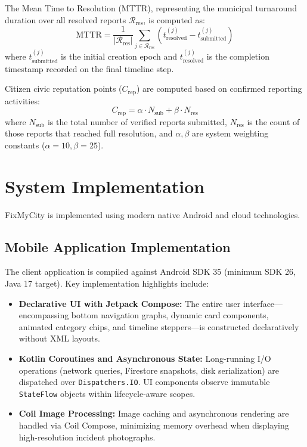 \documentclass[conference]{IEEEtran}
\begin{document}
The Mean Time to Resolution (MTTR), representing the municipal turnaround duration over all resolved reports $\mathcal{R}_{\text{res}}$, is computed as:
\begin{equation}
\text{MTTR} = \frac{1}{|\mathcal{R}_{\text{res}}|} \sum_{j \in \mathcal{R}_{\text{res}}} \left( t_{\text{resolved}}^{(j)} - t_{\text{submitted}}^{(j)} \right)
\end{equation}
where $t_{\text{submitted}}^{(j)}$ is the initial creation epoch and $t_{\text{resolved}}^{(j)}$ is the completion timestamp recorded on the final timeline step.

Citizen civic reputation points ($C_{\text{rep}}$) are computed based on confirmed reporting activities:
\begin{equation}
C_{\text{rep}} = \alpha \cdot N_{\text{sub}} + \beta \cdot N_{\text{res}}
\end{equation}
where $N_{\text{sub}}$ is the total number of verified reports submitted, $N_{\text{res}}$ is the count of those reports that reached full resolution, and $\alpha, \beta$ are system weighting constants ($\alpha = 10, \beta = 25$).

\section{System Implementation}

FixMyCity is implemented using modern native Android and cloud technologies.

\subsection{Mobile Application Implementation}
The client application is compiled against Android SDK 35 (minimum SDK 26, Java 17 target). Key implementation highlights include:
\begin{itemize}
    \item \textbf{Declarative UI with Jetpack Compose:} The entire user interface---encompassing bottom navigation graphs, dynamic card components, animated category chips, and timeline steppers---is constructed declaratively without XML layouts.
    \item \textbf{Kotlin Coroutines and Asynchronous State:} Long-running I/O operations (network queries, Firestore snapshots, disk serialization) are dispatched over \texttt{Dispatchers.IO}. UI components observe immutable \texttt{StateFlow} objects within lifecycle-aware scopes.
    \item \textbf{Coil Image Processing:} Image caching and asynchronous rendering are handled via Coil Compose, minimizing memory overhead when displaying high-resolution incident photographs.
\end{itemize}
\end{document}
